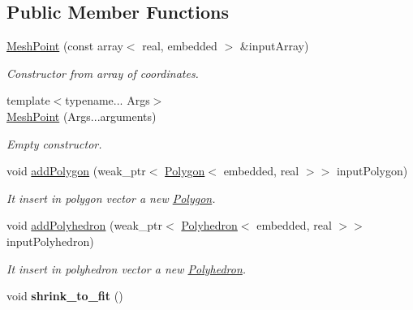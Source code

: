\subsection*{Public Member Functions}
\begin{DoxyCompactItemize}
\item 
\hyperlink{class_mesh_point_aa172f99891420d566250fa3df4f69263}{Mesh\+Point} (const array$<$ real, embedded $>$ \&input\+Array)\hypertarget{class_mesh_point_aa172f99891420d566250fa3df4f69263}{}\label{class_mesh_point_aa172f99891420d566250fa3df4f69263}

\begin{DoxyCompactList}\small\item\em Constructor from array of coordinates. \end{DoxyCompactList}\item 
{\footnotesize template$<$typename... Args$>$ }\\\hyperlink{class_mesh_point_a9fce0473490e3f1447d6adc100df166a}{Mesh\+Point} (Args...\+arguments)
\begin{DoxyCompactList}\small\item\em Empty constructor. \end{DoxyCompactList}\item 
void \hyperlink{class_mesh_point_ad13eb69436888b26b2d8a4eda9ebf21b}{add\+Polygon} (weak\+\_\+ptr$<$ \hyperlink{class_polygon}{Polygon}$<$ embedded, real $>$$>$ input\+Polygon)\hypertarget{class_mesh_point_ad13eb69436888b26b2d8a4eda9ebf21b}{}\label{class_mesh_point_ad13eb69436888b26b2d8a4eda9ebf21b}

\begin{DoxyCompactList}\small\item\em It insert in polygon vector a new \hyperlink{class_polygon}{Polygon}. \end{DoxyCompactList}\item 
void \hyperlink{class_mesh_point_a60b10a88168d410b63a191fa297ba088}{add\+Polyhedron} (weak\+\_\+ptr$<$ \hyperlink{class_polyhedron}{Polyhedron}$<$ embedded, real $>$$>$ input\+Polyhedron)\hypertarget{class_mesh_point_a60b10a88168d410b63a191fa297ba088}{}\label{class_mesh_point_a60b10a88168d410b63a191fa297ba088}

\begin{DoxyCompactList}\small\item\em It insert in polyhedron vector a new \hyperlink{class_polyhedron}{Polyhedron}. \end{DoxyCompactList}\item 
void {\bfseries shrink\+\_\+to\+\_\+fit} ()\hypertarget{class_mesh_point_a3d9ebecff4fe87012077db61e25afba1}{}\label{class_mesh_point_a3d9ebecff4fe87012077db61e25afba1}


\end{DoxyCompactItemize}
